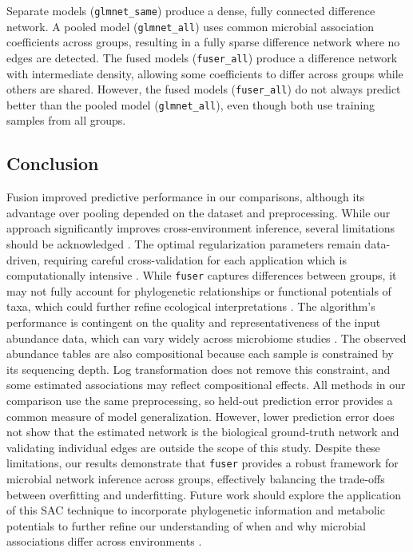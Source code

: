 \documentclass[]{Liebert_Author_revised}
\begin{document}
Separate models (\texttt{glmnet\_same}) produce a dense, fully connected difference network.
A pooled model (\texttt{glmnet\_all}) uses common microbial association coefficients across groups, resulting in a fully sparse difference network where no edges are detected.
The fused models (\texttt{fuser\_all}) produce a difference network with intermediate density, allowing some coefficients to differ across groups while others are shared.
However, the fused models (\texttt{fuser\_all}) do not always predict better than the pooled model (\texttt{glmnet\_all}), even though both use training samples from all groups.

\subsection{Conclusion}
Fusion improved predictive performance in our comparisons, although its advantage over pooling depended on the dataset and preprocessing.
While our approach significantly improves cross-environment inference, several limitations should be acknowledged \citep{dohlman2019interactome}.
The optimal regularization parameters remain data-driven, requiring careful cross-validation for each application which is computationally intensive \citep{hocking2024soaksameotherallkfoldcrossvalidation, agyapong2025cross}.
While \texttt{fuser} captures differences between groups, it may not fully account for phylogenetic relationships or functional potentials of taxa, which could further refine ecological interpretations \citep{liu2024phylo,kunin2005phylogenetic,Douglas2020}.
The algorithm's performance is contingent on the quality and representativeness of the input abundance data, which can vary widely across microbiome studies \citep{Sinha2017,McLaren2019,Gibbons2018}.
The observed abundance tables are also compositional because each sample is constrained by its sequencing depth. 
Log transformation does not remove this constraint, and some estimated associations may reflect compositional effects. 
All methods in our comparison use the same preprocessing, so held-out prediction error provides a common measure of model generalization. 
However, lower prediction error does not show that the estimated network is the biological ground-truth network and validating individual edges are outside the scope of this study.
Despite these limitations, our results demonstrate that \texttt{fuser} provides a robust framework for microbial network inference across groups, effectively balancing the trade-offs between overfitting and underfitting.
Future work should explore the application of this SAC technique to incorporate phylogenetic information and metabolic potentials to further refine our understanding of when and why microbial associations differ across environments \citep{liu2024phylo,dohlman2019interactome}.
\end{document}
